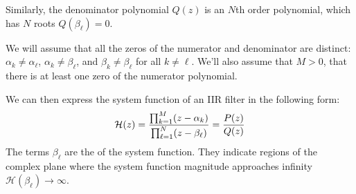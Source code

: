 Similarly, the denominator polynomial $Q(z)$ is an $N$th order
polynomial, which has $N$ roots $Q(\beta_{\ell})=0$. 

We will assume that all the zeros of the numerator and denominator
are distinct: $\alpha_{k} \ne \alpha_{\ell}$,
$\alpha_{k} \ne \beta_{\ell}$, and $\beta_{k} \ne \beta_{\ell}$ for
all $k\ne \ell$. We'll also assume that $M>0$, that there is at least
one zero of the numerator polynomial.

We can then express the system function of an IIR filter in the
following form:
\begin{equation}
\mathcal{H}(z) = \frac{\prod_{k=1}^{M}(z-\alpha_{k})}{\prod_{\ell=1}^{N}(z-\beta_{\ell} )} = \frac{P(z)}{Q(z)}
\end{equation}
The terms $\beta_{\ell}$ are the \emph{} of the
system function. They indicate regions of the complex plane where the
system function magnitude approaches infinity
$\mathcal{H}(\beta_{\ell})\rightarrow \infty$.

